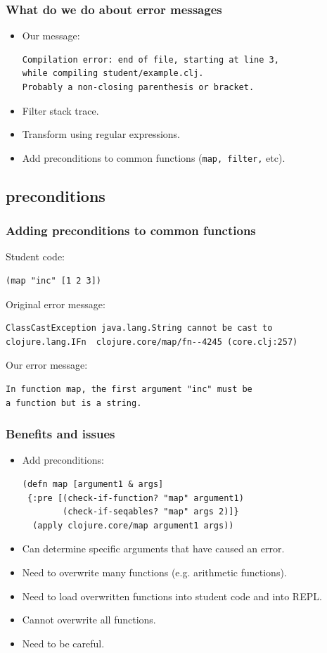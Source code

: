 \documentclass{beamer}
\begin{document}
\begin{frame}[fragile]
   \frametitle { What do we do about error messages}
\begin{itemize}
\item Our message:
\begin{verbatim}
Compilation error: end of file, starting at line 3,
while compiling student/example.clj.
Probably a non-closing parenthesis or bracket.
\end{verbatim}
\item Filter stack trace. 
\item Transform using regular expressions. 
\item Add preconditions to common functions ({\tt map, filter,} etc). 
\end{itemize}
\end{frame}

\subsection{preconditions}
\begin{frame}[fragile]
   \frametitle {Adding preconditions to common functions }
Student code:
\begin{verbatim}
(map "inc" [1 2 3])
\end{verbatim} 

Original error message:
\begin{verbatim}
ClassCastException java.lang.String cannot be cast to
clojure.lang.IFn  clojure.core/map/fn--4245 (core.clj:257)
\end{verbatim} 

Our error message: 
\begin{verbatim}
In function map, the first argument "inc" must be
a function but is a string.
\end{verbatim}
\end{frame}

\begin{frame}[fragile]
 \frametitle {Benefits and issues}
\begin{itemize}
\item Add preconditions:
\begin{verbatim}
(defn map [argument1 & args]
 {:pre [(check-if-function? "map" argument1)
        (check-if-seqables? "map" args 2)]}
  (apply clojure.core/map argument1 args))
\end{verbatim}
\item Can determine specific arguments that have caused an error. 
\item Need to overwrite many functions (e.g. arithmetic functions).
\item Need to load overwritten functions into student code and into REPL.
\item Cannot overwrite all functions. 
\item Need to be careful. 
\end{itemize}
\end{frame}
\end{document}
